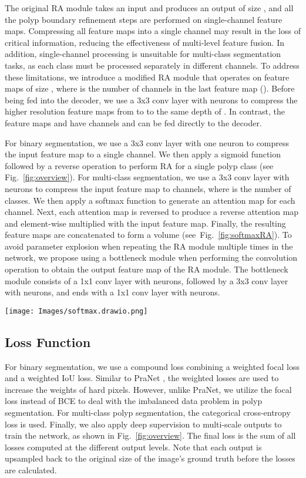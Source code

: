 \documentclass{article}
\begin{document}
The original RA module \cite{pranet} takes an input and produces an output of size , and all the polyp boundary refinement steps are performed on single-channel feature maps. Compressing all feature maps into a single channel may result in the loss of critical information, reducing the effectiveness of multi-level feature fusion. In addition, single-channel processing is unsuitable for multi-class segmentation tasks, as each class must be processed separately in different channels.
To address these limitations, we introduce a modified RA module that operates on feature maps of size , where  is the number of channels in the last feature map (). Before being fed into the decoder, we use a 3x3 conv layer with  neurons to compress the higher resolution feature maps from  to  to the same depth of . In contrast, the feature maps  and  have  channels and can be fed directly to the decoder.

For binary segmentation, we use a 3x3 conv layer with one neuron to compress the input feature map to a single channel. We then apply a sigmoid function followed by a reverse operation to perform RA for a single polyp class (see Fig.~\ref{fig:overview}).
For multi-class segmentation, we use a 3x3 conv layer with  neurons to compress the input feature map to  channels, where  is the number of classes. We then apply a softmax function to generate an attention map for each channel. Next, each attention map is reversed to produce a reverse attention map and element-wise multiplied with the input feature map. Finally, the resulting feature maps are concatenated to form a  volume (see~Fig.~\ref{fig:softmaxRA}).
To avoid parameter explosion when repeating the RA module multiple times in the network, we propose using a bottleneck module when performing the convolution operation to obtain the output feature map of the RA module. The bottleneck module consists of a 1x1 conv layer with  neurons, followed by a 3x3 conv layer with  neurons, and ends with a 1x1 conv layer with  neurons.

\begin{figure*}[!ht]
\centering
\texttt{[image: Images/softmax.drawio.png]} 
\caption{The architecture of Softmax RA module for multi-class segmentation.}
\label{fig:softmaxRA}
\end{figure*}

\subsection{Loss Function}
For binary segmentation, we use a compound loss combining a weighted focal loss and a weighted IoU loss.
Similar to PraNet \cite{pranet}, the weighted losses are used to increase the weights of hard pixels. However, unlike PraNet, we utilize the focal loss \cite{focalloss} instead of BCE to deal with the imbalanced data problem in polyp segmentation. For multi-class polyp segmentation, the categorical cross-entropy loss is used.
Finally, we also apply deep supervision to multi-scale outputs to train the network, as shown in Fig.~\ref{fig:overview}. The final loss is the sum of all losses computed at the different output levels. Note that each output is upsampled back to the original size of the image's ground truth before the losses are calculated.
\end{document}
